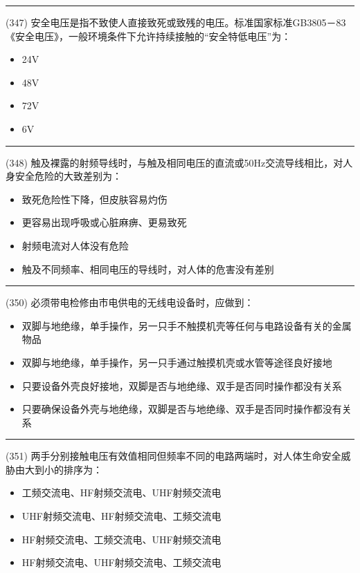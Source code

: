 \documentclass[twocolumn,hyperref,UTF8]{ctexart}  %
\begin{document}
\noindent\rule{0.5\textwidth}{1pt}
\heiti (347) 安全电压是指不致使人直接致死或致残的电压。标准国家标准GB3805－83《安全电压》，一般环境条件下允许持续接触的“安全特低电压”为： \songti {\color{gray} [LK1000] }
\begin{itemize}
	\item  24V
	\item  48V
	\item  72V
	\item  6V
\end{itemize}


\noindent\rule{0.5\textwidth}{1pt}
\heiti (348) 触及裸露的射频导线时，与触及相同电压的直流或50Hz交流导线相比，对人身安全危险的大致差别为： \songti {\color{gray} [LK1001] }
\begin{itemize}
	\item  致死危险性下降，但皮肤容易灼伤
	\item  更容易出现呼吸或心脏麻痹、更易致死
	\item  射频电流对人体没有危险
	\item  触及不同频率、相同电压的导线时，对人体的危害没有差别
\end{itemize}


\noindent\rule{0.5\textwidth}{1pt}
\heiti (350) 必须带电检修由市电供电的无线电设备时，应做到： \songti {\color{gray} [LK1040] }
\begin{itemize}
	\item  双脚与地绝缘，单手操作，另一只手不触摸机壳等任何与电路设备有关的金属物品
	\item  双脚与地绝缘，单手操作，另一只手通过触摸机壳或水管等途径良好接地
	\item  只要设备外壳良好接地，双脚是否与地绝缘、双手是否同时操作都没有关系
	\item  只要确保设备外壳与地绝缘，双脚是否与地绝缘、双手是否同时操作都没有关系
\end{itemize}


\noindent\rule{0.5\textwidth}{1pt}
\heiti (351) 两手分别接触电压有效值相同但频率不同的电路两端时，对人体生命安全威胁由大到小的排序为： \songti {\color{gray} [LK1043] }
\begin{itemize}
	\item  工频交流电、HF射频交流电、UHF射频交流电
	\item  UHF射频交流电、HF射频交流电、工频交流电
	\item  HF射频交流电、工频交流电、UHF射频交流电
	\item  HF射频交流电、UHF射频交流电、工频交流电
\end{itemize}
\end{document}

